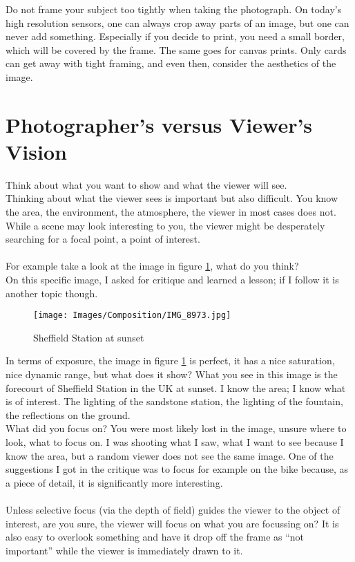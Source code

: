 Do not frame your subject too tightly when taking the photograph. On today's high resolution sensors, one can always crop away parts of an image, but one can never add something. Especially if you decide to print, you need a small border, which will be covered by the frame. The same goes for canvas prints. Only cards can get away with tight framing, and even then, consider the aesthetics of the image.

\section{Photographer's versus Viewer's Vision}

Think about what you want to show and what the viewer will see.
\\
Thinking about what the viewer sees is important but also difficult. You know the area, the environment, the atmosphere, the viewer in most cases does not. While a scene may look interesting to you, the viewer might be desperately searching for a focal point, a point of interest.
\\
\\
For example take a look at the image in figure \ref{fig:IMG_8973}, what do you think?
\\
On this specific image, I asked for critique and learned a lesson; if I follow it is another topic though.

\begin{figure}[htb]
	\centering
		\texttt{[image: Images/Composition/IMG\_8973.jpg]}
	\caption{Sheffield Station at sunset}
	\label{fig:IMG_8973}
\end{figure}

In terms of exposure, the image in figure \ref{fig:IMG_8973} is perfect, it has a nice saturation, nice dynamic range, but what does it show? What you see in this image is the forecourt of Sheffield Station in the UK at sunset. I know the area; I know what is of interest. The lighting of the sandstone station, the lighting of the fountain, the reflections on the ground.
\\
What did you focus on? You were most likely lost in the image, unsure where to look, what to focus on. I was shooting what I saw, what I want to see because I know the area, but a random viewer does not see the same image. One of the suggestions I got in the critique was to focus for example on the bike because, as a piece of detail, it is significantly more interesting.
\\
\\
Unless selective focus (via the depth of field) guides the viewer to the object of interest, are you sure, the viewer will focus on what you are focussing on? It is also easy to overlook something and have it drop off the frame as ``not important'' while the viewer is immediately drawn to it.

